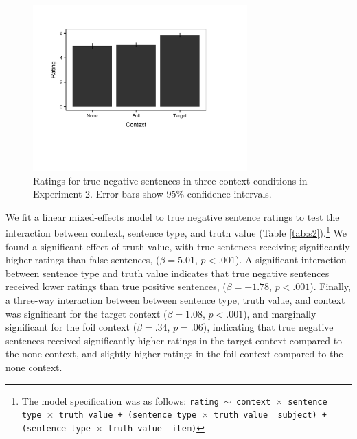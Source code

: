 \documentclass[10pt,letterpaper]{article}
\begin{document}
\begin{figure}
\begin{center} 
\includegraphics[width=3.25in]{figures/study2.pdf}
\caption{\label{fig:s2} Ratings for true negative sentences in three context conditions in Experiment 2.  Error bars show 95\% confidence intervals.}
\end{center} 
\end{figure}

We fit a linear mixed-effects model to true negative sentence ratings   to test the interaction between context, sentence type, and truth value (Table \ref{tab:s2}).\footnote{ The model specification was as follows: \texttt{rating $\sim$ context~$\times$~sentence type~$\times$~truth value + (sentence type~$\times$~truth value~\textbar~subject) +  (sentence type~$\times$~truth value~\textbar~item)}}  We found a significant effect of truth value, with true sentences receiving significantly higher ratings than false sentences, ($\beta= 5.01$, $p< .001$).  A significant interaction between sentence type and truth value indicates that true negative sentences received lower ratings than true positive sentences, ($\beta= -1.78$, $p< .001$).  Finally, a three-way interaction between between sentence type, truth value, and context was significant for the target context ($\beta= 1.08$, $p< .001$), and marginally significant for the foil context ($\beta= .34$, $p=.06$), indicating that true negative sentences received significantly higher ratings in the target context compared to the none context, and slightly higher ratings in the foil context compared to the none context.  
\end{document}
